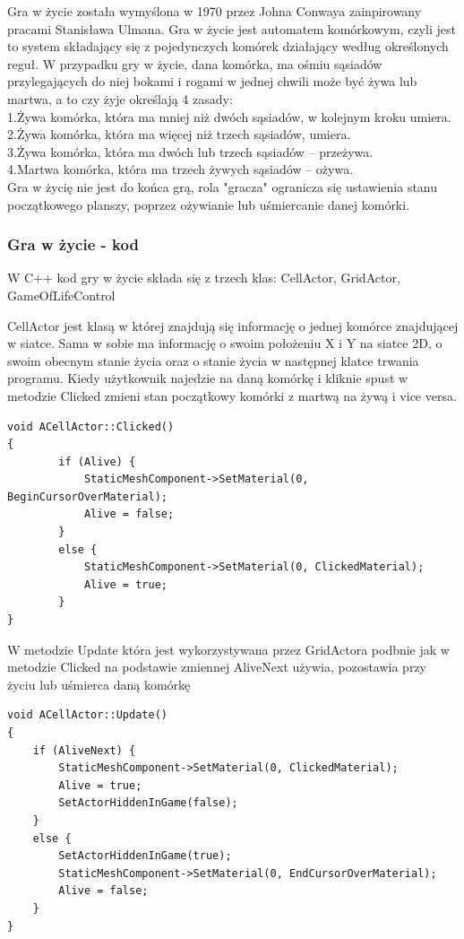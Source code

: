 \documentclass[a4paper,12pt,reqno]{article}
\begin{document}
Gra w życie została wymyślona w 1970 przez Johna Conwaya zainpirowany pracami Stanisława Ulmana. Gra w życie jest automatem komórkowym, czyli jest to system składający się z pojedynczych komórek działający według określonych reguł. W przypadku gry w życie, dana komórka, ma ośmiu sąsiadów przylegających do niej bokami i rogami w jednej chwili może być żywa lub martwa, a to czy żyje określają 4 zasady:\\
1.Żywa komórka, która ma mniej niż dwóch sąsiadów, w kolejnym kroku umiera. \\
2.Żywa komórka, która ma więcej niż trzech sąsiadów, umiera.\\
3.Żywa komórka, która ma dwóch lub trzech sąsiadów – przeżywa.\\
4.Martwa komórka, która ma trzech żywych sąsiadów – ożywa.\\

Gra w życię nie jest do końca grą, rola "gracza" ogranicza się ustawienia stanu początkowego planszy, poprzez ożywianie lub uśmiercanie danej komórki.


\subsubsection{Gra w życie - kod}

W C++ kod gry w życie składa się z trzech klas: CellActor, GridActor, GameOfLifeControl

CellActor jest klasą w której znajdują się informację o jednej komórce znajdującej w siatce. Sama w sobie ma informację o swoim położeniu X i Y na siatce 2D, o swoim obecnym stanie życia oraz o stanie życia w następnej klatce trwania programu. 
Kiedy użytkownik najedzie na daną komórkę i kliknie spust w metodzie Clicked zmieni stan początkowy komórki z martwą na żywą i vice versa.
\begin{lstlisting}
void ACellActor::Clicked()
{
		if (Alive) {
			StaticMeshComponent->SetMaterial(0, BeginCursorOverMaterial);
			Alive = false;
		}
		else {
			StaticMeshComponent->SetMaterial(0, ClickedMaterial);
			Alive = true;
		}
}
\end{lstlisting}

W metodzie Update która jest wykorzystywana przez GridActora podbnie jak w metodzie Clicked na podstawie zmiennej AliveNext używia, pozostawia przy życiu lub uśmierca daną komórkę

\begin{lstlisting} 
void ACellActor::Update()
{
	if (AliveNext) {
		StaticMeshComponent->SetMaterial(0, ClickedMaterial);
		Alive = true;
		SetActorHiddenInGame(false);
	}
	else {
		SetActorHiddenInGame(true);
		StaticMeshComponent->SetMaterial(0, EndCursorOverMaterial);
		Alive = false;
	}
}
\end{lstlisting}
\end{document}
